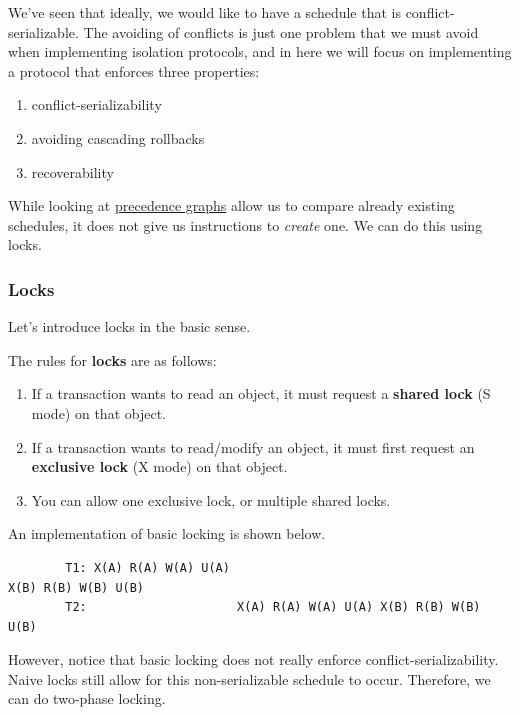    We've seen that ideally, we would like to have a schedule that is conflict-serializable. The avoiding of conflicts is just one problem that we must avoid when implementing isolation protocols, and in here we will focus on implementing a protocol that enforces three properties: 
    \begin{enumerate}
      \item conflict-serializability 
      \item avoiding cascading rollbacks 
      \item recoverability
    \end{enumerate}
    While looking at \hyperref[def:precedence-graph]{precedence graphs} allow us to compare already existing schedules, it does not give us instructions to \textit{create} one. We can do this using locks. 

  \subsubsection{Locks}

    Let's introduce locks in the basic sense. 

    \begin{definition}[Locks]
      \label{def:locks}
      The rules for \textbf{locks} are as follows: 
      \begin{enumerate}
        \item If a transaction wants to read an object, it must request a \textbf{shared lock} (S mode) on that object. 
        \item If a transaction wants to read/modify an object, it must first request an \textbf{exclusive lock} (X mode) on that object. 
        \item You can allow one exclusive lock, or multiple shared locks. 
      \end{enumerate}
    \end{definition}

    \begin{example}
      \label{ex:basic-locking}
      An implementation of basic locking is shown below. 
      \begin{lstlisting}
        T1: X(A) R(A) W(A) U(A)                                         X(B) R(B) W(B) U(B) 
        T2:                     X(A) R(A) W(A) U(A) X(B) R(B) W(B) U(B) 
      \end{lstlisting}
    \end{example}

    However, notice that basic locking does not really enforce conflict-serializability. Naive locks still allow for this non-serializable schedule to occur. Therefore, we can do two-phase locking. 

